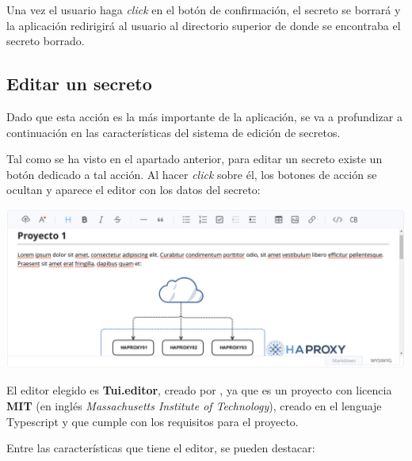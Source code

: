 \documentclass{\ClassPath/viu-tfm-template}
\begin{document}
Una vez el usuario haga \textit{click} en el botón de confirmación, el secreto se borrará y la aplicación redirigirá al usuario al directorio superior de donde se encontraba el secreto borrado.

\hypertarget{editar_secreto}{}
\subsection{Editar un secreto}

Dado que esta acción es la más importante de la aplicación, se va a profundizar a continuación en las características del sistema de edición de secretos.

Tal como se ha visto en el apartado anterior, para editar un secreto existe un botón dedicado a tal acción. Al hacer \textit{click} sobre él, los botones de acción se ocultan y aparece el editor con los datos del secreto:

\begin{center}
    \includegraphics[width=\linewidth]{img/editor.png}
\end{center}

El editor elegido es \textbf{Tui.editor}, creado por \textcite{nhn}, ya que es un proyecto con licencia \textbf{MIT} (en inglés \textit{Massachusetts Institute of Technology}), creado en el lenguaje Typescript y que cumple con los requisitos para el proyecto.

Entre las características que tiene el editor, se pueden destacar:
\end{document}
